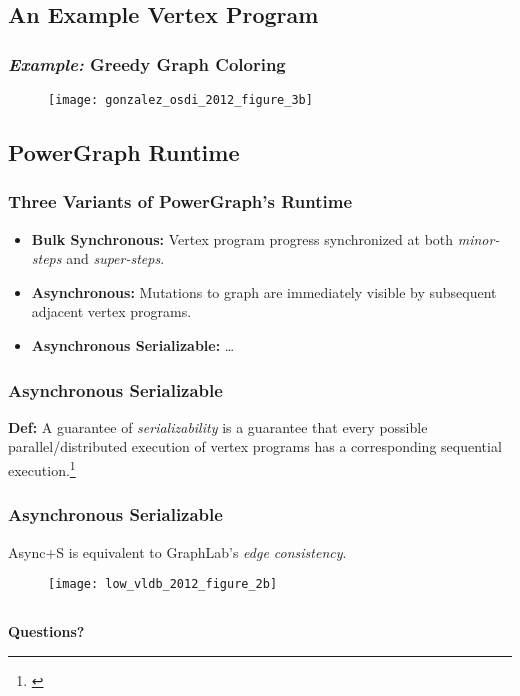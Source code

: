 \subsection{An Example Vertex Program}

\begin{frame}
  \frametitle{\textit{Example:} Greedy Graph Coloring}
  \begin{figure}
    \centering
    \texttt{[image: gonzalez\_osdi\_2012\_figure\_3b]}
    \caption{\cite[OSDI '12]{gonzalez2012powergraph}}
  \end{figure}
\end{frame}


\subsection{PowerGraph Runtime}

\begin{frame}
  \frametitle{Three Variants of PowerGraph's Runtime}
  \begin{itemize}
    \item \textbf{Bulk Synchronous:} Vertex program progress synchronized at
          both \textit{minor-steps} and \textit{super-steps}.
    \item \textbf{Asynchronous:} Mutations to graph are immediately visible by
          subsequent adjacent vertex programs.
    \item \textbf{Asynchronous Serializable:} \ldots
  \end{itemize}
\end{frame}

\begin{frame}
  \frametitle{Asynchronous Serializable}
  \textbf{Def:} A guarantee of \textit{serializability} is a guarantee that
    every possible parallel/distributed execution of vertex programs has a
    corresponding sequential execution.\footnote{\cite[OSDI '12]{gonzalez2012powergraph}}
\end{frame}

\begin{frame}
  \frametitle{Asynchronous Serializable}
  \centering
  Async+S is equivalent to GraphLab's \textit{edge consistency}.
  \begin{figure}
    \texttt{[image: low\_vldb\_2012\_figure\_2b]}
    \caption{\cite[VLDB '12]{low2012distributed}}
  \end{figure}
\end{frame}


\subsection{}

\begin{frame}
  \centering
  \textbf{\Large Questions?}
\end{frame}
